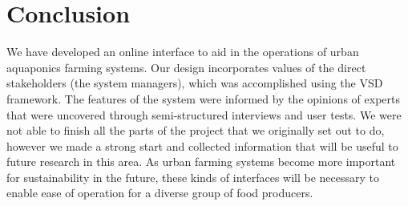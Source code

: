 \documentclass{sigchi}
\begin{document}
\section{Conclusion}

We have developed an online interface to aid in the operations of urban aquaponics farming systems. Our design incorporates values of the direct stakeholders (the system managers), which was accomplished using the VSD framework. The features of the system were informed by the opinions of experts that were uncovered through semi-structured interviews and user tests. We were not able to finish all the parts of the project that we originally set out to do, however we made a strong start and collected information that will be useful to future research in this area. As urban farming systems become more important for sustainability in the future, these kinds of interfaces will be necessary to enable ease of operation for a diverse group of food producers.

%
%
%
%
%
\balance



\end{document}

